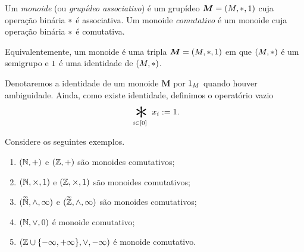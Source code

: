 \begin{definition}
Um \emph{monoide} (ou \emph{grupídeo associativo}) é um grupídeo $\bm M=(M,\ast,1)$ cuja operação binária $\ast$ é associativa. Um monoide \emph{comutativo} é um monoide cuja operação binária $\ast$ é comutativa.
\end{definition}

Equivalentemente, um monoide é uma tripla $\bm M=(M,\ast,1)$ em que $(M,\ast)$ é um semigrupo e $1$ é uma identidade de $(M,\ast)$.

\begin{notation}
Denotaremos a identidade de um monoide $\bm M$ por $1_M$ quando houver ambiguidade. Ainda, como existe identidade, definimos o operatório vazio
	\begin{equation*}
	\bigopb_{i \in [0]} x_i := \id.
	\end{equation*}
\end{notation}

\begin{example}
Considere os seguintes exemplos.
	\begin{enumerate}
	\item $(\mathbb{N},+)$ e $(\mathbb{Z},+)$ são monoides comutativos;
	\item $(\mathbb{N},\times,1)$ e $(\mathbb{Z},\times,1)$ são monoides comutativos;
	\item $(\accentset{\infty}{\mathbb{N}},\mathbin{\wedge},\infty)$ e $(\accentset{\infty}{\mathbb{Z}},\mathbin{\wedge},\infty)$ são monoides comutativos;
	\item $(\mathbb{N},\mathbin{\vee},0)$ é monoide comutativo;
	\item $(\mathbb{Z} \cup \{-\infty,+\infty\},\mathbin{\vee},-\infty)$ é monoide comutativo.
	\end{enumerate}
\end{example}



